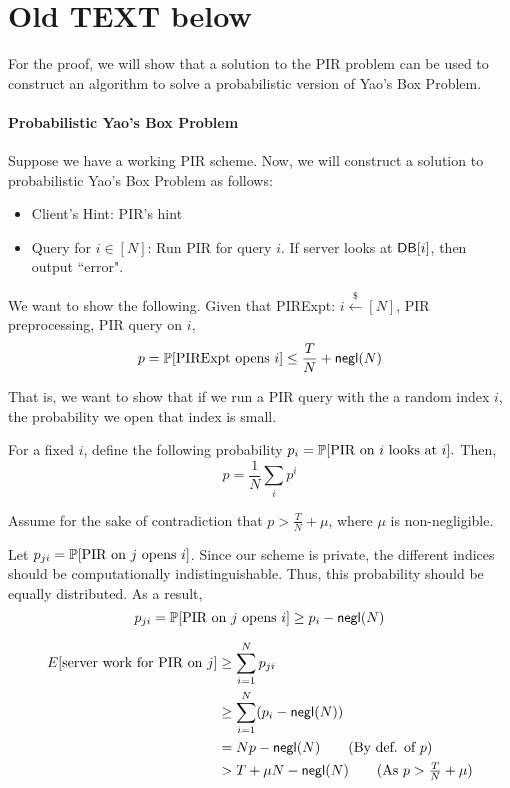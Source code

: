 \section*{Old TEXT below}
\vspace{5mm}

For the proof, we will show that a solution to the PIR problem can be used to construct an algorithm to solve a probabilistic version of Yao's Box Problem.

\paragraph{Probabilistic Yao's Box Problem}
Suppose we have a working PIR scheme. Now, we will construct a solution to probabilistic Yao's Box Problem as follows:

\begin{itemize}
    \item Client's Hint: PIR's hint
    \item Query for $i \in [N]$: Run PIR for query $i$. If server looks at ${\sf DB}[i]$, then output ``error".
\end{itemize}

We want to show the following. Given that PIRExpt: $i \xleftarrow{\$} [N]$, PIR preprocessing, PIR query on $i$,
\[p =\mathbb{P}[\text{PIRExpt opens $i$}] \le \frac{T}{N} + {\sf negl}(N)\]

That is, we want to show that if we run a PIR query with the a random index $i$, the probability we open that index is small.

For a fixed $i$, define the following probability $p_i = \mathbb{P}[\text{PIR on $i$ looks at $i$}].$ Then, 
\[p =\frac{1}{N} \sum_i p^i\]

Assume for the sake of contradiction that  $p > \frac{T}{N} + \mu$, where $\mu$ is non-negligible.

Let $p_{ji} = \mathbb{P}[\text{PIR on $j$ opens $i$}]$. Since our scheme is private, the different indices should be computationally indistinguishable. Thus, this probability should be equally distributed. As a result,
\[p_{ji} = \mathbb{P}[\text{PIR on $j$ opens $i$}] \ge p_i - {\sf negl}(N)\]

\begin{align*}
    E[\text{server work for PIR on $j$}] &\ge \sum_{i=1}^N p_{ji} \\
    &\ge \sum_{i=1}^N (p_{i} - \negl(N))\\
    &= Np - \negl(N) \tag{By def. of $p$}\\
    &> T + \mu N - \negl(N) \tag{As $p > \frac{T}{N} + \mu$}\\ 
\end{align*}

